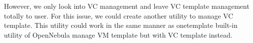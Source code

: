 \documentclass[conference]{IEEEtran}
\begin{document}
However, we only look into VC management and leave VC template management totally to user.
For this issue, we could create another utility to manage VC template.
This utility could work in the same manner as onetemplate built-in utility of OpenNebula manage VM template but with VC template instead.












%
%
%
%




\end{document}
